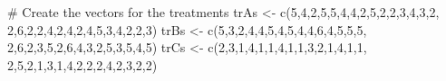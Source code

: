 \documentclass[
  letterpaper,
]{book}
\newenvironment{Shaded}{\begin{snugshade}}{\end{snugshade}}
\newcommand{\CommentTok}[1]{\textcolor[rgb]{0.37,0.37,0.37}{#1}}
\newcommand{\DecValTok}[1]{\textcolor[rgb]{0.68,0.00,0.00}{#1}}
\newcommand{\FunctionTok}[1]{\textcolor[rgb]{0.28,0.35,0.67}{#1}}
\newcommand{\NormalTok}[1]{\textcolor[rgb]{0.00,0.23,0.31}{#1}}
\newcommand{\OtherTok}[1]{\textcolor[rgb]{0.00,0.23,0.31}{#1}}
\begin{document}
\begin{Shaded}
\begin{Highlighting}[]
\CommentTok{\# Create the vectors for the treatments}
\NormalTok{trAs }\OtherTok{\textless{}{-}} \FunctionTok{c}\NormalTok{(}\DecValTok{5}\NormalTok{,}\DecValTok{4}\NormalTok{,}\DecValTok{2}\NormalTok{,}\DecValTok{5}\NormalTok{,}\DecValTok{5}\NormalTok{,}\DecValTok{4}\NormalTok{,}\DecValTok{4}\NormalTok{,}\DecValTok{2}\NormalTok{,}\DecValTok{5}\NormalTok{,}\DecValTok{2}\NormalTok{,}\DecValTok{2}\NormalTok{,}\DecValTok{3}\NormalTok{,}\DecValTok{4}\NormalTok{,}\DecValTok{3}\NormalTok{,}\DecValTok{2}\NormalTok{,}
          \DecValTok{2}\NormalTok{,}\DecValTok{6}\NormalTok{,}\DecValTok{2}\NormalTok{,}\DecValTok{2}\NormalTok{,}\DecValTok{4}\NormalTok{,}\DecValTok{2}\NormalTok{,}\DecValTok{4}\NormalTok{,}\DecValTok{2}\NormalTok{,}\DecValTok{4}\NormalTok{,}\DecValTok{5}\NormalTok{,}\DecValTok{3}\NormalTok{,}\DecValTok{4}\NormalTok{,}\DecValTok{2}\NormalTok{,}\DecValTok{2}\NormalTok{,}\DecValTok{3}\NormalTok{)}
\NormalTok{trBs }\OtherTok{\textless{}{-}} \FunctionTok{c}\NormalTok{(}\DecValTok{5}\NormalTok{,}\DecValTok{3}\NormalTok{,}\DecValTok{2}\NormalTok{,}\DecValTok{4}\NormalTok{,}\DecValTok{4}\NormalTok{,}\DecValTok{5}\NormalTok{,}\DecValTok{4}\NormalTok{,}\DecValTok{5}\NormalTok{,}\DecValTok{4}\NormalTok{,}\DecValTok{4}\NormalTok{,}\DecValTok{6}\NormalTok{,}\DecValTok{4}\NormalTok{,}\DecValTok{5}\NormalTok{,}\DecValTok{5}\NormalTok{,}\DecValTok{5}\NormalTok{,}
          \DecValTok{2}\NormalTok{,}\DecValTok{6}\NormalTok{,}\DecValTok{2}\NormalTok{,}\DecValTok{3}\NormalTok{,}\DecValTok{5}\NormalTok{,}\DecValTok{2}\NormalTok{,}\DecValTok{6}\NormalTok{,}\DecValTok{4}\NormalTok{,}\DecValTok{3}\NormalTok{,}\DecValTok{2}\NormalTok{,}\DecValTok{5}\NormalTok{,}\DecValTok{3}\NormalTok{,}\DecValTok{5}\NormalTok{,}\DecValTok{4}\NormalTok{,}\DecValTok{5}\NormalTok{)}
\NormalTok{trCs }\OtherTok{\textless{}{-}} \FunctionTok{c}\NormalTok{(}\DecValTok{2}\NormalTok{,}\DecValTok{3}\NormalTok{,}\DecValTok{1}\NormalTok{,}\DecValTok{4}\NormalTok{,}\DecValTok{1}\NormalTok{,}\DecValTok{1}\NormalTok{,}\DecValTok{4}\NormalTok{,}\DecValTok{1}\NormalTok{,}\DecValTok{1}\NormalTok{,}\DecValTok{3}\NormalTok{,}\DecValTok{2}\NormalTok{,}\DecValTok{1}\NormalTok{,}\DecValTok{4}\NormalTok{,}\DecValTok{1}\NormalTok{,}\DecValTok{1}\NormalTok{,}
          \DecValTok{2}\NormalTok{,}\DecValTok{5}\NormalTok{,}\DecValTok{2}\NormalTok{,}\DecValTok{1}\NormalTok{,}\DecValTok{3}\NormalTok{,}\DecValTok{1}\NormalTok{,}\DecValTok{4}\NormalTok{,}\DecValTok{2}\NormalTok{,}\DecValTok{2}\NormalTok{,}\DecValTok{2}\NormalTok{,}\DecValTok{4}\NormalTok{,}\DecValTok{2}\NormalTok{,}\DecValTok{3}\NormalTok{,}\DecValTok{2}\NormalTok{,}\DecValTok{2}\NormalTok{)}

\end{Highlighting}
\end{Shaded}
\end{document}
